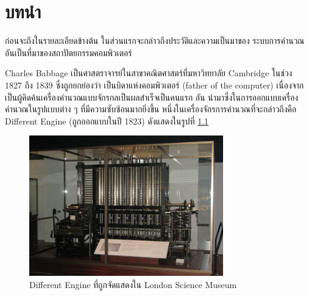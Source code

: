 \chapter{บทนำ}

\par{
ก่อนจะถึงในรายละเอียดข้างต้น 
ในส่วนแรกจะกล่าวถึงประวัติและความเป็นมาของ
ระบบการคำนวณอันเป็นที่มาของสถาปัตยกรรมคอมพิวเตอร์
}

\par{
Charles Babbage เป็นศาสตราจารย์ในสาขาคณิตศาสตร์ที่มหาวิทยาลัย 
Cambridge ในช่วง 1827 ถึง 1839 ซึ่งถูกยกย่องว่า
เป็นบิดาแห่งคอมพิวเตอร์ (father of the computer) 
\cite{halacy1970charles}
เนื่องจากเป็นผู้คิดค้นเครื่องคำนวณแบบจักรกลเป็นผลสำเร็จเป็นคนแรก อัน
นำมาซึ่งในการออกแบบเครื่องคำนวณในรูปแบบต่าง ๆ ที่มีความซับซ้อนมากยิ่งขึ้น 
หนึ่งในเครื่องจักรการคำนวณที่จะกล่าวถึงคือ Different Engine 
(ถูกออกแบบในปี 1823) ดังแสดงในรูปที่ 
\ref{fig_babbage_difference_engine}
}

\begin{figure}[h]
\centering
\includegraphics[width=0.75\textwidth]{fig/Babbage_Difference_Engine.png}
\caption{Different Engine ที่ถูกจัดแสดงใน London Science Museum}
\label{fig_babbage_difference_engine}
\end{figure}


